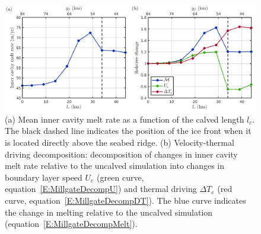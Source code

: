 \documentclass[draft]{agujournal2019}
\begin{document}
\begin{figure}
    \centering
    \includegraphics[width = \textwidth]{../make_figures/plots/figure4.png}
    \caption{(a) Mean inner cavity melt rate as a function of the calved length $l_c$. The black dashed line indicates the position of the ice front when it is located directly above the seabed ridge. (b) Velocity-thermal driving decomposition: decomposition of changes in inner cavity melt rate relative to the uncalved simulation into changes in boundary layer speed $U_e$ (green curve, equation~\eqref{E:MillgateDecompU}) and thermal driving $\Delta T_e$ (red curve, equation~\eqref{E:MillgateDecompDT}). The blue curve indicates the change in melting relative to the uncalved simulation (equation~\eqref{E:MillgateDecompMelt}).}
    \label{fig:figure4}
\end{figure}
\end{document}
